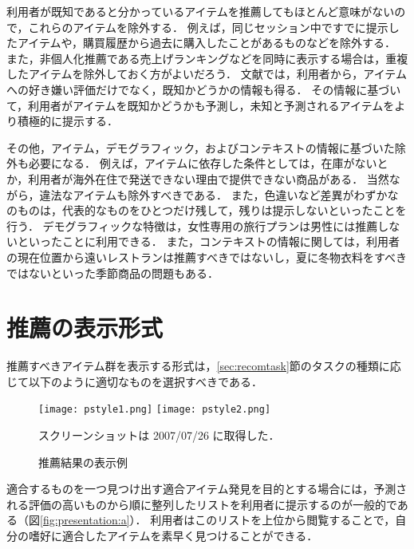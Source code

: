 利用者が既知であると分かっているアイテムを推薦してもほとんど意味がないので，これらのアイテムを除外する．
例えば，同じセッション中ですでに提示したアイテムや，購買履歴から過去に購入したことがあるものなどを除外する．
また，非個人化推薦である売上げランキングなどを同時に表示する場合は，重複したアイテムを除外しておく方がよいだろう．
文献\cite{trieice:07:03}では，利用者から，アイテムへの好き嫌い評価だけでなく，既知かどうかの情報も得る．
その情報に基づいて，利用者がアイテムを既知かどうかも予測し，未知と予測されるアイテムをより積極的に提示する．

その他，アイテム，デモグラフィック，およびコンテキストの情報に基づいた除外も必要になる．
例えば，アイテムに依存した条件としては，在庫がないとか，利用者が海外在住で発送できない理由で提供できない商品がある．
当然ながら，違法なアイテムも除外すべきである．
また，色違いなど差異がわずかなのものは，代表的なものをひとつだけ残して，残りは提示しないといったことを行う．
デモグラフィックな特徴は，女性専用の旅行プランは男性には推薦しないといったことに利用できる．
また，コンテキストの情報に関しては，利用者の現在位置から遠いレストランは推薦すべきではないし，夏に冬物衣料をすべきではないといった季節商品の問題もある．

\section{推薦の表示形式}
\label{sec:present:style}

推薦すべきアイテム群を表示する形式は，\ref{sec:recomtask}節のタスクの種類に応じて以下のように適切なものを選択すべきである．

\begin{figure}
\centering
{}%
{\texttt{[image: pstyle1.png]}}%
\hspace{0.02\linewidth}%
%
{\texttt{[image: pstyle2.png]}}\\
\caption{推薦結果の表示例}
\label{fig:presentation}
{\footnotesize スクリーンショットは 2007/07/26 に取得した．}
\end{figure}

適合するものを一つ見つけ出す適合アイテム発見を目的とする場合には，予測される評価の高いものから順に整列したリストを利用者に提示するのが一般的である（図\ref{fig:presentation:a}）．
利用者はこのリストを上位から閲覧することで，自分の嗜好に適合したアイテムを素早く見つけることができる．

